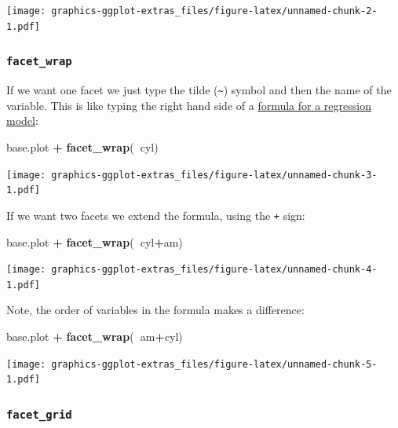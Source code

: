 \documentclass[]{article}
\newenvironment{Shaded}{\begin{snugshade}}{\end{snugshade}}
\newcommand{\KeywordTok}[1]{\textcolor[rgb]{0.13,0.29,0.53}{\textbf{#1}}}
\newcommand{\StringTok}[1]{\textcolor[rgb]{0.31,0.60,0.02}{#1}}
\newcommand{\OperatorTok}[1]{\textcolor[rgb]{0.81,0.36,0.00}{\textbf{#1}}}
\newcommand{\NormalTok}[1]{#1}
\theoremstyle{definition}
\theoremstyle{definition}
\theoremstyle{definition}
\theoremstyle{remark}
\begin{document}
\texttt{[image: graphics-ggplot-extras\_files/figure-latex/unnamed-chunk-2-1.pdf]}

\subsubsection*{\texorpdfstring{\texttt{facet\_wrap}}{facet\_wrap}}\label{facet_wrap}

If we want one facet we just type the tilde (\texttt{\textasciitilde{}})
symbol and then the name of the variable. This is like typing the right
hand side of a \href{formulae}{formula for a regression model}:

\begin{Shaded}
\begin{Highlighting}[]
\NormalTok{base.plot }\OperatorTok{+}\StringTok{ }\KeywordTok{facet_wrap}\NormalTok{(}\OperatorTok{~}\NormalTok{cyl)}
\end{Highlighting}
\end{Shaded}

\texttt{[image: graphics-ggplot-extras\_files/figure-latex/unnamed-chunk-3-1.pdf]}

If we want two facets we extend the formula, using the \texttt{+} sign:

\begin{Shaded}
\begin{Highlighting}[]
\NormalTok{base.plot }\OperatorTok{+}\StringTok{ }\KeywordTok{facet_wrap}\NormalTok{(}\OperatorTok{~}\NormalTok{cyl}\OperatorTok{+}\NormalTok{am)}
\end{Highlighting}
\end{Shaded}

\texttt{[image: graphics-ggplot-extras\_files/figure-latex/unnamed-chunk-4-1.pdf]}

Note, the order of variables in the formula makes a difference:

\begin{Shaded}
\begin{Highlighting}[]
\NormalTok{base.plot }\OperatorTok{+}\StringTok{ }\KeywordTok{facet_wrap}\NormalTok{(}\OperatorTok{~}\NormalTok{am}\OperatorTok{+}\NormalTok{cyl)}
\end{Highlighting}
\end{Shaded}

\texttt{[image: graphics-ggplot-extras\_files/figure-latex/unnamed-chunk-5-1.pdf]}

\subsubsection*{\texorpdfstring{\texttt{facet\_grid}}{facet\_grid}}\label{facet_grid}
\end{document}
